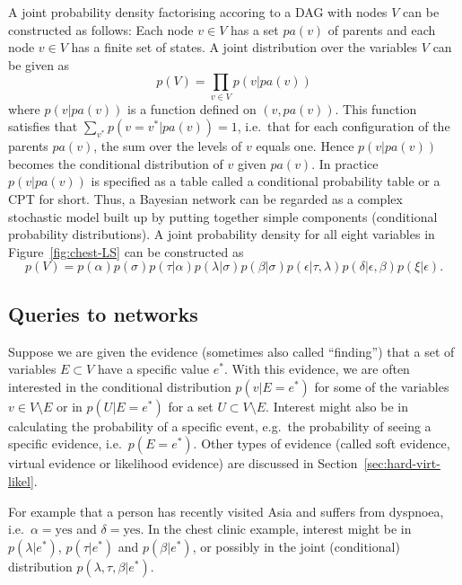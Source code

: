 \documentclass[10pt]{article}\usepackage[]{graphicx}\usepackage[]{color}
\begin{document}
A joint probability density factorising accoring to a DAG with nodes
$V$ can be constructed as follows: Each node $v\in V$ has a set $pa(v)$ of parents and each node
$v\in V$ has a finite set of states. A joint distribution
over the variables $V$ can be given as
\begin{equation}
  \label{eq:dagfact1}
  p(V) = \prod_{v\in V} p(v|pa(v))
\end{equation}
where $p(v|pa(v))$ is a function defined on $(v,pa(v))$. This function
satisfies that $\sum_{v^*} p(v=v^*|pa(v))=1$, i.e.\ that
for each configuration of the parents $pa(v)$, the sum
over the levels of $v$ equals one. Hence $p(v|pa(v))$ becomes the
conditional distribution of $v$ given $pa(v)$.
In practice $p(v|pa(v))$ is specified as a table called a conditional
probability table or a CPT for short.
Thus, a Bayesian network can be regarded as a complex stochastic model built up by
putting together simple components (conditional probability
distributions).
A joint probability density for all eight variables in
Figure~\ref{fig:chest-LS}
can be constructed as 
\begin{equation}
  \label{eq:chestfact1}
  p(V) =
  p(\alpha)p(\sigma)p(\tau|\alpha)p(\lambda|\sigma)p(\beta|\sigma)p(\epsilon|\tau,\lambda)
  p(\delta|\epsilon, \beta)p(\xi|\epsilon).
\end{equation}



\subsection{Queries to networks}
\label{sec:xxx}

Suppose we are given the evidence (sometimes also called ``finding'')
that a set of variables $E\subset V$
have a specific value $e^*$.
With this evidence, we are often interested in the conditional
distribution $p(v|E=e^*)$
for some of the variables $v \in V \setminus E$
or in $p(U|E=e^*)$
for a set $U\subset V \setminus E$. Interest might also be in
calculating the probability of a specific event, e.g.\ the probability
of seeing a specific evidence, i.e.\ $p(E=e^*)$.
Other types of evidence (called soft evidence, virtual evidence or likelihood evidence) are discussed in
Section~\ref{sec:hard-virt-likel}.

For
example that a person has recently visited Asia and suffers from
dyspnoea, i.e.\ $\alpha=\mbox{yes}$ and $\delta=\mbox{yes}$.
In the chest clinic example, interest might be in $p(\lambda|e^*)$, $p(\tau|e^*)$
and  $p(\beta|e^*)$, or possibly in the joint (conditional) distribution
$p(\lambda,\tau,\beta|e^*)$.
\end{document}
